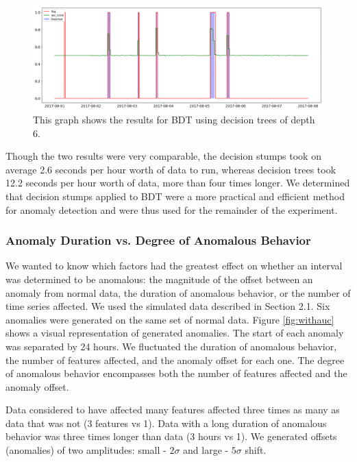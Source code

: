 \documentclass[5p]{elsarticle}
\begin{document}
\begin{figure}[htbp]
    \centering
    \includegraphics[width=\linewidth]{shaded-tree.png}
    \caption{This graph shows the results for BDT using decision trees of depth 6.}
    \label{fig:shaded-tree}
\end{figure}

Though the two results were very comparable, the decision stumps took on average 2.6 seconds per hour worth of data to run, whereas decision trees took 12.2 seconds per hour worth of data, more than four times longer. We determined that decision stumps applied to BDT were a more practical and efficient method for anomaly detection and were thus used for the remainder of the experiment.

\subsubsection{Anomaly Duration vs. Degree of Anomalous Behavior}

We wanted to know which factors had the greatest effect on whether an interval was determined to be anomalous: the magnitude of the offset between an anomaly from normal data, the duration of anomalous behavior, or the number of time series affected. 
We used the simulated data described in Section 2.1. 
Six anomalies were generated on the same set of normal data. Figure \ref{fig:withauc} shows a visual representation of generated anomalies. 
The start of each anomaly was separated by 24 hours. We fluctuated the duration of anomalous behavior, the number of features affected, and the anomaly offset for each one. The degree of anomalous behavior encompasses both the number of features affected and the anomaly offset.

Data considered to have affected many features affected three times as many as data that was not (3 features vs 1). Data with a long duration of anomalous behavior was three times longer than data (3 hours vs 1). We generated offsets (anomalies) of two amplitudes: small - $2\sigma$ and large - $5\sigma$ shift. 
\end{document}

